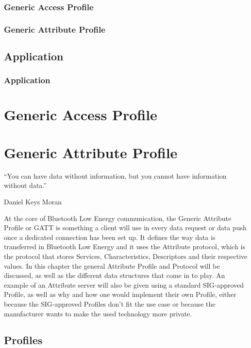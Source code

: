 \documentclass[pdftex,a4paper,12pt,twoside]{report}
\begin{document}
\subsection{Generic Access Profile}
\label{subsec:hostGAP}

\subsection{Generic Attribute Profile}
\label{subsec:hostGATT}

\section{Application}
\label{sec:stackApplication}

\subsection{Application}
\label{subsec:applicationApp}

\chapter{Generic Access Profile}
\label{ch:gap}

\chapter{Generic Attribute Profile}
\label{ch:gatt}
\epigraph{``You can have data without information, but you cannot have information without data.''}{Daniel Keys Moran}
At the core of Bluetooth Low Energy communication, the Generic Attribute Profile or GATT is something a client will use in every data request or data push once a dedicated connection has been set up. It defines the way data is transferred in Bluetooth Low Energy and it uses the Attribute protocol, which is the protocol that stores Services, Characteristics, Descriptors and their respective values. In this chapter the general Attribute Profile and Protocol will be discussed, as well as the different data structures that come in to play. An example of an Attribute server will also be given using a standard SIG-approved Profile, as well as why and how one would implement their own Profile, either because the SIG-approved Profiles don't fit the use case or because the manufacturer wants to make the used technology more private.

\newpage{}

\section{Profiles}
\label{sec:profiles}
\end{document}
